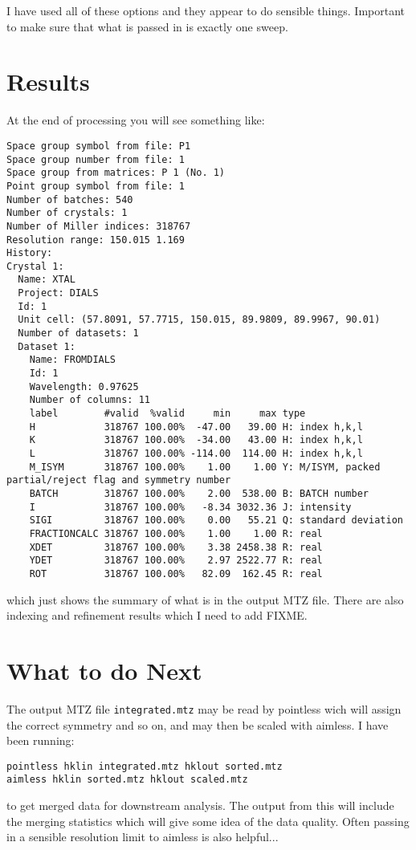 \documentclass[a4paper, 11pt]{article}
\begin{document}
\noindent
I have used all of these options and they appear to do sensible things. Important to make sure that what is passed in is exactly one sweep.

\section{Results}

At the end of processing you will see something like:

{\small
\begin{verbatim}
Space group symbol from file: P1
Space group number from file: 1
Space group from matrices: P 1 (No. 1)
Point group symbol from file: 1
Number of batches: 540
Number of crystals: 1
Number of Miller indices: 318767
Resolution range: 150.015 1.169
History:
Crystal 1:
  Name: XTAL
  Project: DIALS
  Id: 1
  Unit cell: (57.8091, 57.7715, 150.015, 89.9809, 89.9967, 90.01)
  Number of datasets: 1
  Dataset 1:
    Name: FROMDIALS
    Id: 1
    Wavelength: 0.97625
    Number of columns: 11
    label        #valid  %valid     min     max type
    H            318767 100.00%  -47.00   39.00 H: index h,k,l
    K            318767 100.00%  -34.00   43.00 H: index h,k,l
    L            318767 100.00% -114.00  114.00 H: index h,k,l
    M_ISYM       318767 100.00%    1.00    1.00 Y: M/ISYM, packed partial/reject flag and symmetry number
    BATCH        318767 100.00%    2.00  538.00 B: BATCH number
    I            318767 100.00%   -8.34 3032.36 J: intensity
    SIGI         318767 100.00%    0.00   55.21 Q: standard deviation
    FRACTIONCALC 318767 100.00%    1.00    1.00 R: real
    XDET         318767 100.00%    3.38 2458.38 R: real
    YDET         318767 100.00%    2.97 2522.77 R: real
    ROT          318767 100.00%   82.09  162.45 R: real
\end{verbatim}
}

\noindent
which just shows the summary of what is in the output MTZ file. There are also indexing and refinement results which I need to add FIXME.

\section{What to do Next}

The output MTZ file \verb|integrated.mtz| may be read by pointless wich will assign the correct symmetry and so on, and may then be scaled with aimless. I have been running:

{\small
\begin{verbatim}
pointless hklin integrated.mtz hklout sorted.mtz
aimless hklin sorted.mtz hklout scaled.mtz
\end{verbatim}
}

\noindent
to get merged data for downstream analysis. The output from this will include the merging statistics which will give some idea of the data quality. Often passing in a sensible resolution limit to aimless is also helpful...
\end{document}
